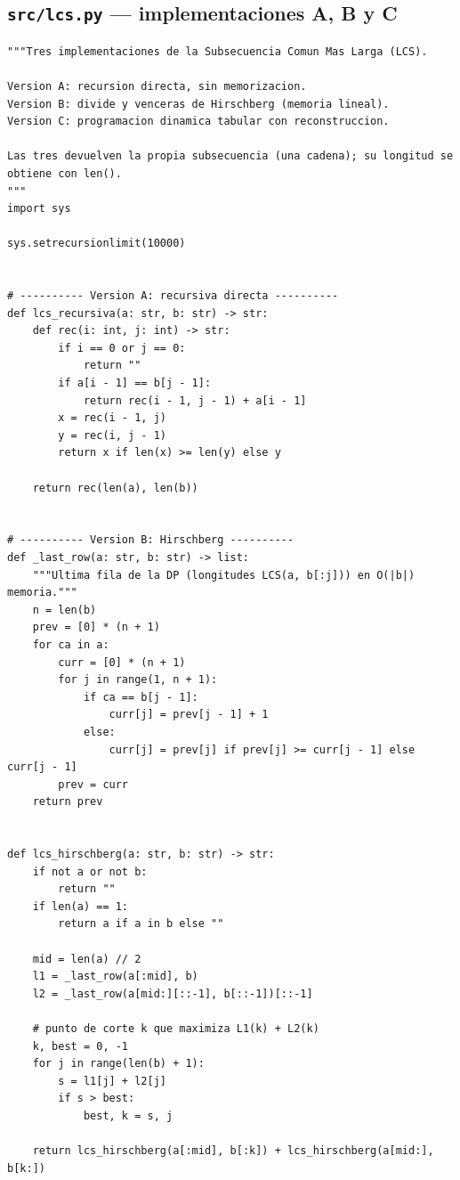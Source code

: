 \documentclass[11pt,a4paper]{article}
\begin{document}
\lstlistoflistings

\subsection{\texttt{src/lcs.py} — implementaciones A, B y C}\label{anexo:lcs}

\begin{lstlisting}[style=py, caption={\texttt{src/lcs.py}}]
"""Tres implementaciones de la Subsecuencia Comun Mas Larga (LCS).

Version A: recursion directa, sin memorizacion.
Version B: divide y venceras de Hirschberg (memoria lineal).
Version C: programacion dinamica tabular con reconstruccion.

Las tres devuelven la propia subsecuencia (una cadena); su longitud se
obtiene con len().
"""
import sys

sys.setrecursionlimit(10000)


# ---------- Version A: recursiva directa ----------
def lcs_recursiva(a: str, b: str) -> str:
    def rec(i: int, j: int) -> str:
        if i == 0 or j == 0:
            return ""
        if a[i - 1] == b[j - 1]:
            return rec(i - 1, j - 1) + a[i - 1]
        x = rec(i - 1, j)
        y = rec(i, j - 1)
        return x if len(x) >= len(y) else y

    return rec(len(a), len(b))


# ---------- Version B: Hirschberg ----------
def _last_row(a: str, b: str) -> list:
    """Ultima fila de la DP (longitudes LCS(a, b[:j])) en O(|b|) memoria."""
    n = len(b)
    prev = [0] * (n + 1)
    for ca in a:
        curr = [0] * (n + 1)
        for j in range(1, n + 1):
            if ca == b[j - 1]:
                curr[j] = prev[j - 1] + 1
            else:
                curr[j] = prev[j] if prev[j] >= curr[j - 1] else curr[j - 1]
        prev = curr
    return prev


def lcs_hirschberg(a: str, b: str) -> str:
    if not a or not b:
        return ""
    if len(a) == 1:
        return a if a in b else ""

    mid = len(a) // 2
    l1 = _last_row(a[:mid], b)
    l2 = _last_row(a[mid:][::-1], b[::-1])[::-1]

    # punto de corte k que maximiza L1(k) + L2(k)
    k, best = 0, -1
    for j in range(len(b) + 1):
        s = l1[j] + l2[j]
        if s > best:
            best, k = s, j

    return lcs_hirschberg(a[:mid], b[:k]) + lcs_hirschberg(a[mid:], b[k:])



\end{lstlisting}
\end{document}
